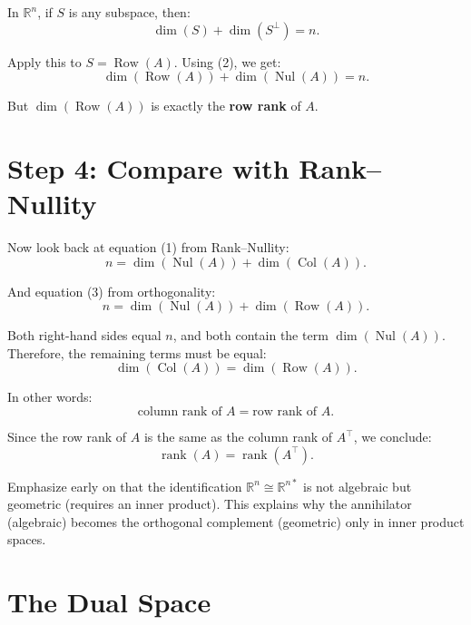 \documentclass[11pt]{article}
\begin{document}
In $ \mathbb{R}^n $, if $ S $ is any subspace, then:
\[
\dim(S) + \dim(S^\perp) = n.
\]

Apply this to $ S = \operatorname{Row}(A) $. Using (2), we get:
\[
\dim(\operatorname{Row}(A)) + \dim(\operatorname{Nul}(A)) = n.
\tag{3}
\]

But $ \dim(\operatorname{Row}(A)) $ is exactly the \textbf{row rank} of $ A $.

\section*{Step 4: Compare with Rank--Nullity}

Now look back at equation (1) from Rank--Nullity:
\[
n = \dim(\operatorname{Nul}(A)) + \dim(\operatorname{Col}(A)).
\]

And equation (3) from orthogonality:
\[
n = \dim(\operatorname{Nul}(A)) + \dim(\operatorname{Row}(A)).
\]

Both right-hand sides equal $ n $, and both contain the term $ \dim(\operatorname{Nul}(A)) $.  
Therefore, the remaining terms must be equal:
\[
\dim(\operatorname{Col}(A)) = \dim(\operatorname{Row}(A)).
\]

In other words:
\[
\text{column rank of } A = \text{row rank of } A.
\]

Since the row rank of $ A $ is the same as the column rank of $ A^\top $, we conclude:
\[
\operatorname{rank}(A) = \operatorname{rank}(A^\top).
\]





















\newpage



Emphasize early on that the identification $\mathbb{R}^n \cong \mathbb{R}^{n*}$  is not algebraic but geometric (requires an inner product). This explains why the annihilator (algebraic) becomes the orthogonal complement (geometric) only in inner product spaces.



\section*{The Dual Space}
\end{document}

